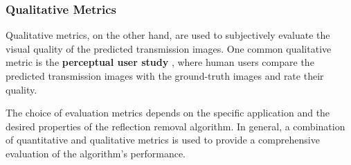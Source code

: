 \subsubsection{Qualitative Metrics}

Qualitative metrics, on the other hand, are used to subjectively evaluate the visual quality of the predicted transmission images. One common qualitative metric is the \textbf{perceptual user study} \cite{zhang2018single}, where human users compare the predicted transmission images with the ground-truth images and rate their quality.

The choice of evaluation metrics depends on the specific application and the desired properties of the reflection removal algorithm. In general, a combination of quantitative and qualitative metrics is used to provide a comprehensive evaluation of the algorithm's performance.
